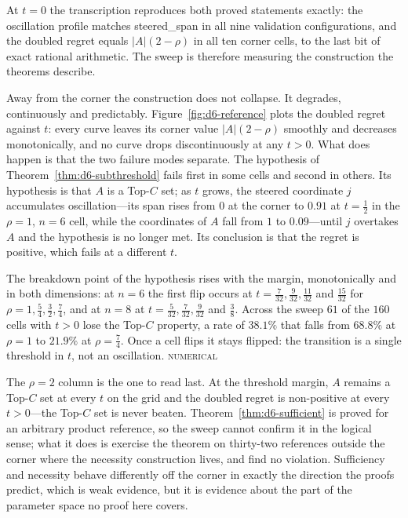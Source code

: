 \documentclass[conference]{IEEEtran}
\theoremstyle{definition}
\newcommand{\lean}[1]{\textsf{\footnotesize #1}}
\newcommand{\NUM}{\textsc{numerical}}
\begin{document}
At $t=0$ the transcription reproduces both proved statements exactly: the oscillation profile
matches \lean{steered\_span} in all nine validation configurations, and the doubled regret
equals $|A|(2-\rho)$ in all ten corner cells, to the last bit of exact rational arithmetic.
The sweep is therefore measuring the construction the theorems describe.

Away from the corner the construction does not collapse. It degrades, continuously and
predictably. Figure~\ref{fig:d6-reference} plots the doubled regret against $t$: every curve
leaves its corner value $|A|(2-\rho)$ smoothly and decreases monotonically, and no curve
drops discontinuously at any $t>0$. What does happen is that the two failure modes separate.
The hypothesis of Theorem~\ref{thm:d6-subthreshold} fails first in some cells and second in
others. Its hypothesis is that $A$ is a Top-$C$ set; as $t$ grows, the steered coordinate $j$
accumulates oscillation---its span rises from $0$ at the corner to $0.91$ at $t=\tfrac12$ in
the $\rho=1$, $n=6$ cell, while the coordinates of $A$ fall from $1$ to $0.09$---until $j$
overtakes $A$ and the hypothesis is no longer met. Its conclusion is that the regret is
positive, which fails at a different $t$.

The breakdown point of the hypothesis rises with the margin, monotonically and in both
dimensions: at $n=6$ the first flip occurs at $t=\tfrac{7}{32},\tfrac{9}{32},\tfrac{11}{32}$
and $\tfrac{15}{32}$ for $\rho=1,\tfrac54,\tfrac32,\tfrac74$, and at $n=8$ at
$t=\tfrac{5}{32},\tfrac{7}{32},\tfrac{9}{32}$ and $\tfrac38$. Across the sweep $61$ of the
$160$ cells with $t>0$ lose the Top-$C$ property, a rate of $38.1\%$ that falls from $68.8\%$
at $\rho=1$ to $21.9\%$ at $\rho=\tfrac74$. Once a cell flips it stays flipped: the
transition is a single threshold in $t$, not an oscillation. \NUM{}

The $\rho=2$ column is the one to read last. At the threshold margin, $A$ remains a Top-$C$
set at every $t$ on the grid and the doubled regret is non-positive at every $t>0$---the
Top-$C$ set is never beaten. Theorem~\ref{thm:d6-sufficient} is proved for an arbitrary product
reference, so the sweep cannot confirm it in the logical sense; what it does is exercise the
theorem on thirty-two references outside the corner where the necessity construction lives,
and find no violation. Sufficiency and necessity behave differently off the corner in exactly
the direction the proofs predict, which is weak evidence, but it is evidence about the part of
the parameter space no proof here covers.
\end{document}
